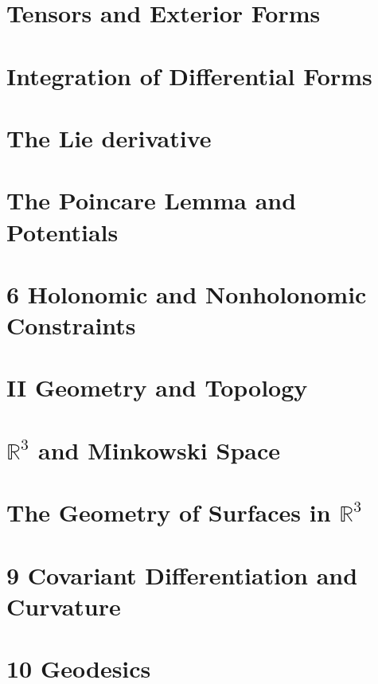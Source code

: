                                                                   
\section{Tensors and Exterior Forms}
		

\section{Integration of Differential Forms}
		

\section{The Lie derivative}
		

\section{The Poincare Lemma and Potentials}
		

\section{6 Holonomic and Nonholonomic Constraints}



\section*{II Geometry and Topology}

\section{$\mathbb R^3$ and Minkowski Space}
		

\section{The Geometry of Surfaces in $\mathbb{R}^3$}

\section{9 Covariant Differentiation and Curvature}
		

\section{10 Geodesics}

